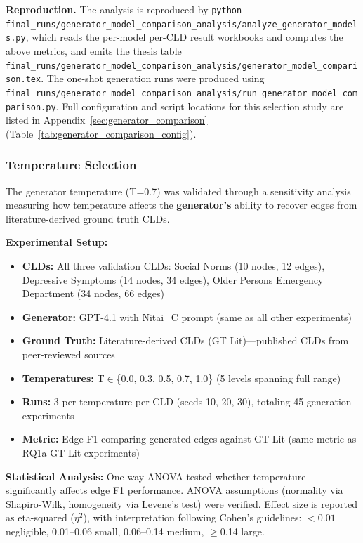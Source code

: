 \textbf{Reproduction.} The analysis is reproduced by \texttt{python final\_runs/generator\_model\_comparison\_analysis/analyze\_generator\_models.py}, which reads the per-model per-CLD result workbooks and computes the above metrics, and emits the thesis table \texttt{final\_runs/generator\_model\_comparison\_analysis/generator\_model\_comparison.tex}. The one-shot generation runs were produced using \texttt{final\_runs/generator\_model\_comparison\_analysis/run\_generator\_model\_comparison.py}.
Full configuration and script locations for this selection study are listed in Appendix~\ref{sec:generator_comparison} (Table~\ref{tab:generator_comparison_config}).

\subsubsection{Temperature Selection}

The generator temperature (T=0.7) was validated through a sensitivity analysis measuring how temperature affects the \textbf{generator's} ability to recover edges from literature-derived ground truth CLDs.

\textbf{Experimental Setup:}
\begin{itemize}[noitemsep]
    \item \textbf{CLDs:} All three validation CLDs: Social Norms (10 nodes, 12 edges), Depressive Symptoms (14 nodes, 34 edges), Older Persons Emergency Department (34 nodes, 66 edges)
    \item \textbf{Generator:} GPT-4.1 with Nitai\_C prompt (same as all other experiments)
    \item \textbf{Ground Truth:} Literature-derived CLDs (GT Lit)---published CLDs from peer-reviewed sources
    \item \textbf{Temperatures:} T$\in$\{0.0, 0.3, 0.5, 0.7, 1.0\} (5 levels spanning full range)
    \item \textbf{Runs:} 3 per temperature per CLD (seeds 10, 20, 30), totaling 45 generation experiments
    \item \textbf{Metric:} Edge F1 comparing generated edges against GT Lit (same metric as RQ1a GT Lit experiments)
\end{itemize}

\textbf{Statistical Analysis:} One-way ANOVA tested whether temperature significantly affects edge F1 performance. ANOVA assumptions (normality via Shapiro-Wilk, homogeneity via Levene's test) were verified. Effect size is reported as eta-squared ($\eta^2$), with interpretation following Cohen's guidelines: $<0.01$ negligible, 0.01--0.06 small, 0.06--0.14 medium, $\geq$0.14 large.

